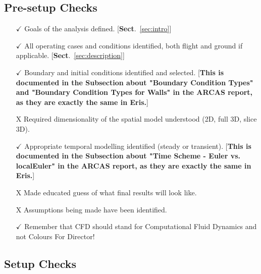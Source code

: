 \documentclass[12pt]{article}
\begin{document}
\subsection*{Pre-setup Checks}
\begin{itemize}
    \item[$\checkmark$] Goals of the analysis defined. [\textbf{Sect}.~\ref{sec:intro}]
    \item[$\checkmark$] All operating cases and conditions identified, both flight and ground if applicable. [\textbf{Sect}.~\ref{sec:description}]
    \item[$\checkmark$] Boundary and initial conditions identified and selected. [\textbf{This is documented in the Subsection about "Boundary Condition Types" and "Boundary Condition Types for Walls" in the ARCAS report, as they are exactly the same in Eris.}]
    \item[X] Required dimensionality of the spatial model understood (2D, full 3D, slice 3D).
    \item[$\checkmark$] Appropriate temporal modelling identified (steady or transient).
    [\textbf{This is documented in the Subsection about "Time Scheme - Euler vs. localEuler" in the ARCAS report, as they are exactly the same in Eris.}]
    \item[X] Made educated guess of what final results will look like.
    \item[X] Assumptions being made have been identified.
    \item[$\checkmark$] Remember that CFD should stand for Computational Fluid Dynamics and not Colours For Director!
\end{itemize}

\subsection*{Setup Checks}
\end{document}
